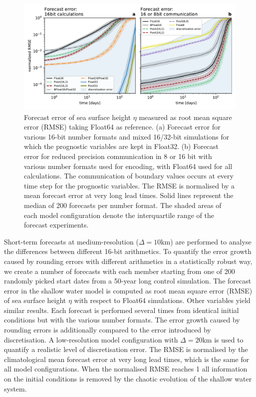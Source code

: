 \documentclass[draft]{agujournal2019}
\begin{document}
\begin{figure}
\includegraphics[width=1\textwidth]{rmse_eta_darker.pdf}
\caption{Forecast error of sea surface height $\eta$ measured as root mean square
error (RMSE) taking Float64 as reference. (a) Forecast error for various 16-bit
number formats and mixed 16/32-bit simulations for which the prognostic variables
are kept in Float32. (b) Forecast error for reduced precision communication in
8 or 16 bit with various number formats used for encoding, with Float64 used for
all calculations. The communication of boundary values occurs at every time step
for the prognostic variables. The RMSE is normalised by a mean forecast error at
very long lead times. Solid lines represent the median of 200 forecasts per number
format. The shaded areas of each model configuration denote the interquartile
range of the forecast experiments.}
\label{fig:rmse}
\end{figure}

Short-term forecasts at medium-resolution ($\Delta = 10$km) are performed to
analyse the differences between different 16-bit arithmetics. To quantify the error
growth caused by rounding errors with different arithmetics in a statistically
robust way, we create a number of forecasts with each member starting from one
of 200 randomly picked start dates from a 50-year long control simulation. The
forecast error in the shallow water model is computed as root mean square error
(RMSE) of sea surface height $\eta$ with respect to Float64 simulations. Other
variables yield similar results. Each forecast is performed several times from
identical initial conditions but with the various number formats. The error growth
caused by rounding errors is additionally compared to the error
introduced by discretisation. A low-resolution model configuration with
$\Delta = 20$km is used to quantify a realistic level of discretisation error.
The RMSE is normalised by the climatological mean forecast error at very long lead
times, which is the same for all model configurations. When the normalised RMSE
reaches 1 all information on the initial conditions is removed by the chaotic
evolution of the shallow water system.
\end{document}
